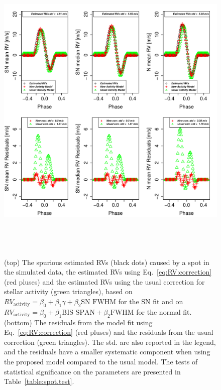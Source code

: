 \documentclass{aa}
\begin{document}
\begin{figure}[htbp]
\begin{center}
\includegraphics[height = 6in]{Spot_NEW_CORRECTION_[3]CorrectionActivity_RadialVelocity_vs_time.pdf} 
   \caption{(top) The spurious estimated RVs (black dots) caused by a spot in the simulated data, the estimated RVs using Eq.~\eqref{eq:RV:correction} (red pluses) and the estimated RVs using the usual correction for stellar activity (green triangles), based on $RV_{\text{activity}}=\beta_0+\beta_1 \gamma + \beta_2 \text{SN FWHM}$ for the SN fit and on $RV_{\text{activity}}=\beta_0+\beta_1 \text{BIS SPAN} + \beta_2 \text{FWHM}$ for the normal fit.
 (bottom) The residuals from the model fit using Eq.~\eqref{eq:RV:correction} (red pluses) and the residuals from the usual correction (green triangles). 
 The std. are also reported in the legend, and the residuals have a smaller systematic component when using the proposed model compared to the usual model.
The tests of statistical significance on the parameters are presented in Table~\ref{table:spot.test}.
}
    \label{fig:spot.correction}
\end{center}
\end{figure}
\end{document}
